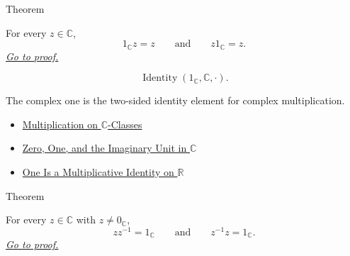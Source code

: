 \begin{theorembox}{Theorem}
\begin{theorem}
\label{thm:one-multiplicative-identity-on-c}
For every \(z\in\mathbb{C}\),
\[
1_{\mathbb{C}}z=z
\qquad\text{and}\qquad
z1_{\mathbb{C}}=z.
\]
\hyperref[prf:one-multiplicative-identity-on-c]{\textit{Go to proof.}}
\end{theorem}
\end{theorembox}


\begin{remark*}
\[
\operatorname{Identity}(1_{\mathbb{C}},\mathbb{C},\cdot).
\]
\end{remark*}

\begin{remark*}[Interpretation]
The complex one is the two-sided identity element for complex multiplication.
\end{remark*}

\begin{dependencies}
\begin{itemize}
  \item \hyperref[def:multiplication-on-c-classes]{Multiplication on $\mathbb{C}$-Classes}
  \item \hyperref[def:zero-one-i-in-c]{Zero, One, and the Imaginary Unit in $\mathbb{C}$}
  \item \hyperref[thm:one-multiplicative-identity-on-r]{One Is a Multiplicative Identity on $\mathbb{R}$}
\end{itemize}
\end{dependencies}

\begin{theorembox}{Theorem}
\begin{theorem}
\label{thm:every-nonzero-complex-has-inverse}
For every \(z\in\mathbb{C}\) with \(z\ne 0_{\mathbb{C}}\),
\[
zz^{-1}=1_{\mathbb{C}}
\qquad\text{and}\qquad
z^{-1}z=1_{\mathbb{C}}.
\]
\hyperref[prf:every-nonzero-complex-has-inverse]{\textit{Go to proof.}}
\end{theorem}
\end{theorembox}


